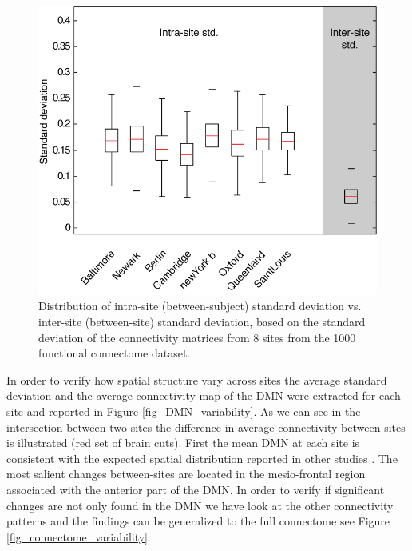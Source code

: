 \documentclass[authoryear]{elsarticle}
\begin{document}
\begin{figure}[H!]
\begin{center}
\includegraphics[width=\linewidth]{../figures/inter_vs_intra_3tonly.png}
\end{center}
\caption[inter vs. intra site variability]{
  Distribution of intra-site (between-subject) standard deviation vs. inter-site (between-site) standard deviation, based on the standard deviation of the connectivity matrices from 8 sites from the 1000 functional connectome dataset.
}
\label{fig_site_variability}
\end{figure}

In order to verify how spatial structure vary across sites the average standard deviation and the average connectivity map of the DMN were extracted for each site and reported in Figure \ref{fig_DMN_variability}. As we can see in the intersection between two sites the difference in average connectivity between-sites is illustrated (red set of brain cuts). First the mean DMN at each site is consistent with the expected spatial distribution reported in other studies \citep{Damoiseaux2006,Dansereau2014,Yan2013a}. The most salient changes between-sites are located in the mesio-frontal region associated with the anterior part of the DMN. In order to verify if significant changes are not only found in the DMN we have look at the other connectivity patterns and the findings can be generalized to the full connectome see Figure \ref{fig_connectome_variability}.
\end{document}
